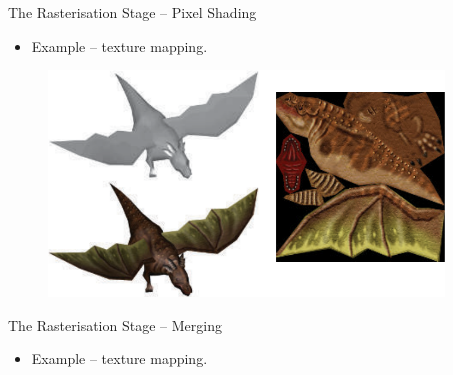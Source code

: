 \documentclass{beamer}
\begin{document}
\begin{frame}{The Rasterisation Stage -- Pixel Shading}

	\begin{itemize}
		\item Example -- texture mapping.
	\end{itemize}

	\vskip 1cm

	\begin{figure}[t]
		\includegraphics[height=6cm]{texture-mapping}
		\centering
	\end{figure}

\end{frame}

\begin{frame}{The Rasterisation Stage -- Merging}

	\begin{itemize}
		\item Example -- texture mapping.
	\end{itemize}

	\vskip 1cm


\end{frame}
\end{document}
